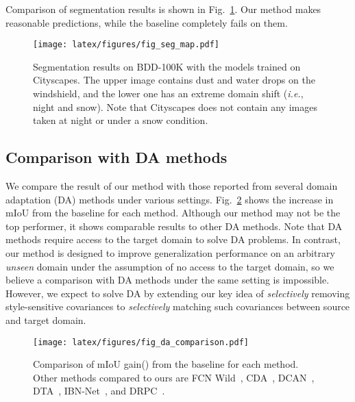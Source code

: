 \documentclass[final]{latex/cvpr}
\begin{document}
Comparison of segmentation results is shown in Fig.~\ref{fig:seg_map}. Our method makes reasonable predictions, while the baseline completely fails on them.


\begin{figure}[h!]
\vspace*{-0.15cm}
  \centering\texttt{[image: latex/figures/fig\_seg\_map.pdf]}
  \vspace*{-0.2cm}
  \caption{Segmentation results on BDD-100K with the models trained on Cityscapes. The upper image contains dust and water drops on the windshield, and the lower one has an extreme domain shift (\textit{i.e.}, night and snow). Note that Cityscapes does not contain any images taken at night or under a snow condition.
  }
\label{fig:seg_map}
\vspace*{-0.3cm}
\end{figure}

\vspace{-0.0cm}
\subsection{Comparison with DA methods}
\vspace{-0.05cm}
We compare the result of our method with those reported from several domain adaptation (DA) methods under various settings. Fig.~\ref{fig:da_comparison} shows the increase in mIoU from the baseline for each method. Although our method may not be the top performer, it shows comparable results to other DA methods. Note that DA methods require access to the target domain to solve DA problems. In contrast, our method is designed to improve generalization performance on an arbitrary \emph{unseen} domain under the assumption of no access to the target domain, so we believe a comparison with DA methods under the same setting is impossible. However, we expect to solve DA by extending our key idea of \emph{selectively} removing style-sensitive covariances to \emph{selectively} matching such covariances between source and target domain.


\begin{figure}[h]
\centering
\begin{center}
  \texttt{[image: latex/figures/fig\_da\_comparison.pdf]}
\end{center}
\vspace*{-0.3cm}
   \caption{Comparison of mIoU gain() from the baseline for each method. Other methods compared to ours are FCN Wild~\cite{hoffman2016fcns}, CDA~\cite{zhang2017curriculum}, DCAN~\cite{wu2018dcan}, DTA~\cite{lee2019drop}, IBN-Net~\cite{pan2018two}, and DRPC~\cite{zhao2017pyramid}.}
\label{fig:da_comparison}
\vspace*{-0.2cm}
\end{figure}
\end{document}
